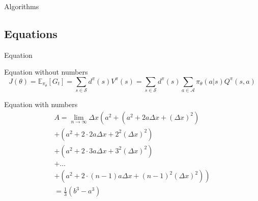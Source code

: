 \documentclass{libs/JITRI_format}
\begin{document}
\begin{frame}{Algorithms}
    \lstset{language=Python}
    
\end{frame}

\subsection{Equations}

\begin{frame}{Equation}
    \begin{block}{Equation without numbers} 
        \begin{equation*}
            J(\theta) = \mathbb{E}_{\pi_\theta}[G_t] = \sum_{s\in\mathcal{S}} d^\pi (s)V^\pi(s)=\sum_{s\in\mathcal{S}} d^\pi(s)\sum_{a\in\mathcal{A}}\pi_\theta(a|s)Q^\pi(s,a)
        \end{equation*}
    \end{block}
%       
\end{frame}

\begin{frame}
    \begin{block}{Equation with numbers}
        \begin{multline}
            A=\lim_{n\rightarrow\infty}\Delta x\left(a^{2}+\left(a^{2}+2a\Delta x+\left(\Delta x\right)^{2}\right)\right.\label{eq:reset}\\
            +\left(a^{2}+2\cdot2a\Delta x+2^{2}\left(\Delta x\right)^{2}\right)\\
            +\left(a^{2}+2\cdot3a\Delta x+3^{2}\left(\Delta x\right)^{2}\right)\\
            +\ldots\\
            \left.+\left(a^{2}+2\cdot(n-1)a\Delta x+(n-1)^{2}\left(\Delta x\right)^{2}\right)\right)\\
            =\frac{1}{3}\left(b^{3}-a^{3}\right)
        \end{multline}
    \end{block}
\end{frame}
\end{document}
